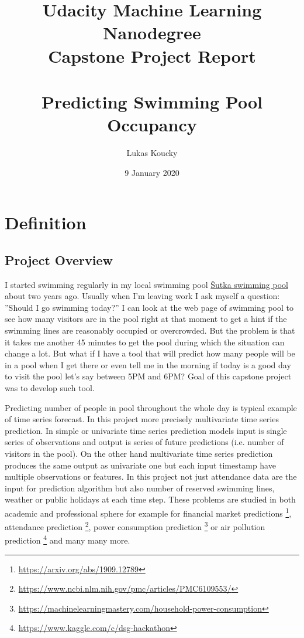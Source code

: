 \documentclass{article}
\title{Udacity Machine Learning Nanodegree\\
       Capstone Project Report \\
        \ \\
        Predicting Swimming Pool Occupancy}
\author{Lukas Koucky}
\date{9 January 2020}
\begin{document}
\maketitle

\section{Definition}
\subsection{Project Overview}
I started swimming regularly in my local swimming pool \href{https://www.sutka.eu/en/}{\v{S}utka swimming pool} about two years ago. Usually when I’m leaving work I ask myself a question: ''Should I go swimming today?'' I can look at the web page of swimming pool to see how many visitors are in the pool right at that moment to get a hint if the swimming lines are reasonably occupied or overcrowded. But the problem is that it takes me another 45 minutes to get the pool during which the situation can change a lot. But what if I have a tool that will predict how many people will be in a pool when I get there or even tell me in the morning if today is a good day to visit the pool let’s say between 5PM and 6PM? Goal of this capstone project was to develop such tool. \par

Predicting number of people in pool throughout the whole day is typical example of time series forecast. In this project more precisely multivariate time series prediction. In simple or univariate time series prediction models input is single series of observations and output is series of future predictions (i.e. number of visitors in the pool). On the other hand multivariate time series prediction produces the same output as univariate one but each input timestamp have multiple observations or features. In this project not just attendance data are the input for prediction algorithm but also number of reserved swimming lines, weather or public holidays at each time step. These problems are studied in both academic and professional sphere for example for financial market predictions \footnote{\url{https://arxiv.org/abs/1909.12789}}, attendance prediction \footnote{\url{https://www.ncbi.nlm.nih.gov/pmc/articles/PMC6109553/}}, power consumption prediction \footnote{\href{https://machinelearningmastery.com/how-to-develop-lstm-models-for-multi-step-time-series-forecasting-of-household-power-consumption/}{https://machinelearningmastery.com/household-power-consumption}} or air pollution prediction \footnote{\url{https://www.kaggle.com/c/dsg-hackathon}} and many many more.\par
\end{document}
